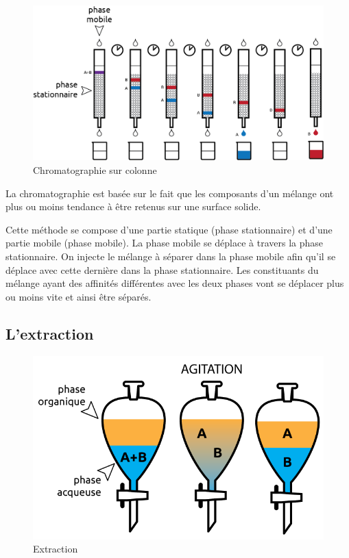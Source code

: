 \documentclass[
  11pt,
  a4paper,
  openany]{book}
\begin{document}
\begin{figure}

{\centering \includegraphics[width=0.67\linewidth]{images/chromatographie} 

}

\caption{Chromatographie sur colonne}\label{fig:chromatographie}
\end{figure}

La chromatographie est basée sur le fait que les composants d'un mélange ont plus ou moins tendance à être retenus sur une surface solide.

Cette méthode se compose d'une partie statique (phase stationnaire) et d'une partie mobile (phase mobile). La phase mobile se déplace à travers la phase stationnaire. On injecte le mélange à séparer dans la phase mobile afin qu'il se déplace avec cette dernière dans la phase stationnaire. Les constituants du mélange ayant des affinités différentes avec les deux phases vont se déplacer plus ou moins vite et ainsi être séparés.

\hypertarget{lextraction}{%
\subsection{L'extraction}\label{lextraction}}

\begin{figure}

{\centering \includegraphics[width=0.45\linewidth]{images/extraction} 

}

\caption{Extraction}\label{fig:extraction}
\end{figure}
\end{document}
